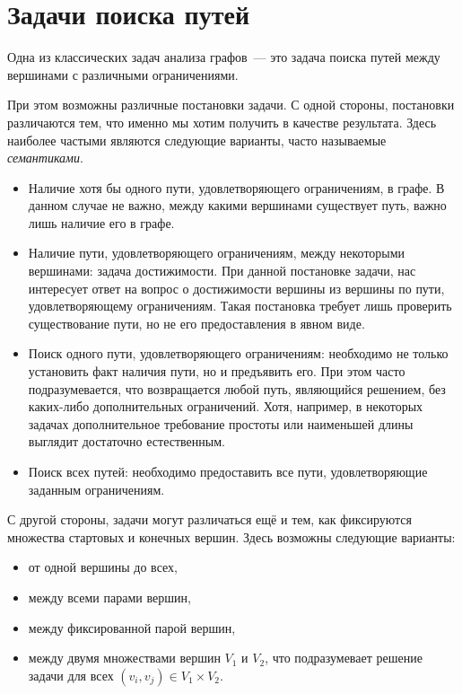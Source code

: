 \section{Задачи поиска путей}
\label{sec:PathProblems}

Одна из классических задач анализа графов~--- это задача поиска путей между вершинами с различными ограничениями.

При этом возможны различные постановки задачи.
С одной стороны, постановки различаются тем, что именно мы хотим получить в качестве результата.
Здесь наиболее частыми являются следующие варианты, часто называемые \emph{семантиками}.


\begin{itemize}
    \item Наличие хотя бы одного пути, удовлетворяющего ограничениям, в графе.
          В данном случае не важно, между какими вершинами существует путь, важно лишь наличие его в графе.
    \item Наличие пути, удовлетворяющего ограничениям, между некоторыми вершинами: задача достижимости.
          При данной постановке задачи, нас интересует ответ на вопрос о достижимости вершины  из вершины  по пути, удовлетворяющему ограничениям.
          Такая постановка требует лишь проверить существование пути, но не его предоставления в явном виде.
    \item Поиск одного пути, удовлетворяющего ограничениям: необходимо не только установить факт наличия пути, но и  предъявить его.
          При этом часто подразумевается, что возвращается любой путь, являющийся решением, без каких-либо дополнительных ограничений.
          Хотя, например, в некоторых задачах дополнительное требование простоты или наименьшей длины выглядит достаточно естественным.
    \item Поиск всех путей: необходимо предоставить все пути, удовлетворяющие заданным ограничениям.
\end{itemize}

С другой стороны, задачи могут различаться ещё и тем, как фиксируются множества стартовых и конечных вершин.
Здесь возможны следующие варианты:
\begin{itemize}
    \item от одной вершины до всех,
    \item между всеми парами вершин,
    \item между фиксированной парой вершин,
    \item между двумя множествами вершин $V_1$ и $V_2$, что подразумевает решение задачи для всех $(v_i,v_j) \in V_1 \times V_2$.
\end{itemize}

